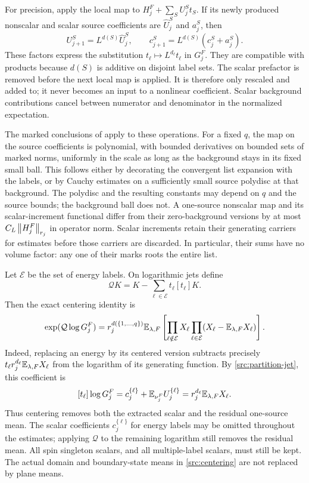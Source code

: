 For precision, apply the local map to
$H_j^F+\sum_S U_j^S t_S$. If its newly produced nonscalar and scalar
source coefficients are $\widehat U_j^S$ and $a_j^S$, then
\begin{equation}
 U_{j+1}^S=L^{d(S)}\widehat U_j^S,
 \qquad
 c_{j+1}^S=L^{d(S)}(c_j^S+a_j^S).
 \label{src:source-recursion}
\end{equation}
These factors express the substitution
$t_\ell\mapsto L^{d_\ell}t_\ell$ in $G_j^F$.
They are compatible with products because $d(S)$ is additive on disjoint
label sets. The scalar prefactor is removed before the next local map is
applied. It is therefore only rescaled and added to; it never becomes an
input to a nonlinear coefficient. Scalar background contributions cancel
between numerator and denominator in the normalized expectation.

The marked conclusions of  apply to these operations. For a
fixed $q$, the map on the source coefficients is polynomial, with bounded
derivatives on bounded sets of marked norms, uniformly in the scale as
long as the background stays in its fixed small ball. This follows either
by decorating the convergent list expansion with the labels, or by Cauchy
estimates on a sufficiently small source polydisc at that background.
The polydisc and the resulting constants may depend on $q$ and the source
bounds; the background ball does not. A one-source nonscalar map and its
scalar-increment functional differ from their zero-background versions
by at most $C_L\left\|H_j^F\right\|_{r_j}$ in operator norm. Scalar increments
retain their generating carriers for estimates before those carriers are
discarded. In particular, their sums have no volume factor: any one of
their marks roots the entire list.

Let $\mathcal E$ be the set of energy labels. On logarithmic jets define
\[
 \mathcal Q K
   =K-\sum_{\ell\in\mathcal E}t_\ell[t_\ell]K.
\]
Then the exact centering identity is
\begin{equation}
 [t_1\cdots t_q]\exp(\mathcal Q\log G_j^F)
 =r_j^{d(\{1,\ldots,q\})}
   {\E}_{\lambda,F}
   \left[
    \prod_{\ell\notin\mathcal E}X_\ell
    \prod_{\ell\in\mathcal E}
       (X_\ell-{\E}_{\lambda,F}X_\ell)
   \right].
 \label{src:centering}
\end{equation}
Indeed, replacing an energy by its centered version subtracts precisely
$t_\ell r_j^{d_\ell}{\mathbb E}_{\lambda,F}X_\ell$ from the logarithm of its
generating function. By \eqref{src:partition-jet}, this coefficient is
\[
 [t_\ell]\log G_j^F
   =c_j^{\{\ell\}}+{\mathbb E}_{\nu_j^F}U_j^{\{\ell\}}
   =r_j^{d_\ell}{\mathbb E}_{\lambda,F}X_\ell.
\]
Thus centering removes both the extracted scalar and the residual
one-source mean. The scalar coefficients $c_j^{\{\ell\}}$ for energy
labels may be omitted throughout the estimates; applying $\mathcal Q$
to the remaining logarithm still removes the residual mean. All spin
singleton scalars, and all multiple-label scalars, must still be kept.
The actual domain and boundary-state means in
\eqref{src:centering} are not replaced by plane means.

